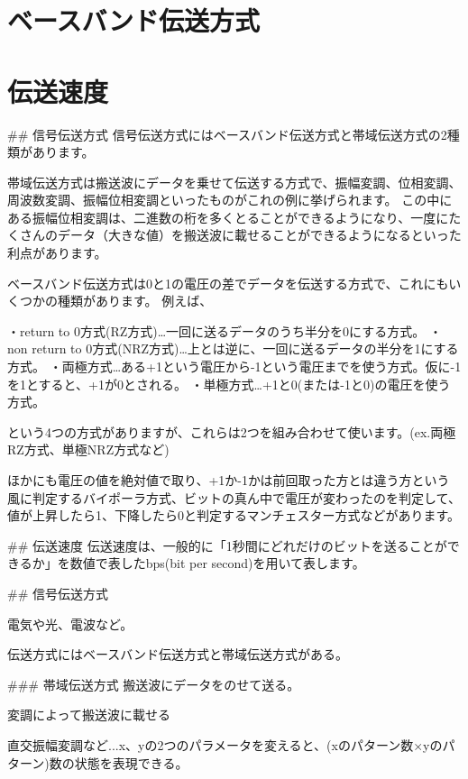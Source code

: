 \section{ベースバンド伝送方式}

\section{伝送速度}

## 信号伝送方式
信号伝送方式にはベースバンド伝送方式と帯域伝送方式の2種類があります。

帯域伝送方式は搬送波にデータを乗せて伝送する方式で、振幅変調、位相変調、周波数変調、振幅位相変調といったものがこれの例に挙げられます。  
この中にある振幅位相変調は、二進数の桁を多くとることができるようになり、一度にたくさんのデータ（大きな値）を搬送波に載せることができるようになるといった利点があります。

ベースバンド伝送方式は0と1の電圧の差でデータを伝送する方式で、これにもいくつかの種類があります。 
例えば、

・return to 0方式(RZ方式)…一回に送るデータのうち半分を0にする方式。  
・non return to 0方式(NRZ方式)…上とは逆に、一回に送るデータの半分を1にする方式。  
・両極方式…ある+1という電圧から-1という電圧までを使う方式。仮に-1を1とすると、+1が0とされる。  
・単極方式…+1と0(または-1と0)の電圧を使う方式。

という4つの方式がありますが、これらは2つを組み合わせて使います。(ex.両極RZ方式、単極NRZ方式など)

ほかにも電圧の値を絶対値で取り、+1か-1かは前回取った方とは違う方という風に判定するバイポーラ方式、ビットの真ん中で電圧が変わったのを判定して、値が上昇したら1、下降したら0と判定するマンチェスター方式などがあります。

## 伝送速度
伝送速度は、一般的に「1秒間にどれだけのビットを送ることができるか」を数値で表したbps(bit per second)を用いて表します。





## 信号伝送方式

電気や光、電波など。

伝送方式にはベースバンド伝送方式と帯域伝送方式がある。

### 帯域伝送方式
搬送波にデータをのせて送る。

変調によって搬送波に載せる

直交振幅変調など...x、yの2つのパラメータを変えると、(xのパターン数×yのパターン)数の状態を表現できる。


